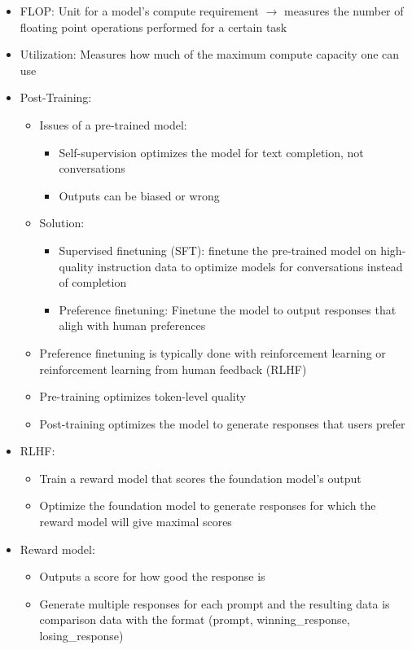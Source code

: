 \documentclass[11pt]{scrartcl}
\begin{document}
\begin{itemize}
	\item FLOP: Unit for a model's compute requirement $\to$ measures the number of floating point operations performed for a certain task
	\item Utilization: Measures how much of the maximum compute capacity one can use
	\item Post-Training:
	\begin{itemize}
		\item Issues of a pre-trained model: 
		\begin{itemize}
			\item Self-supervision optimizes the model for text completion, not conversations
			\item Outputs can be biased or wrong
		\end{itemize}
		\item Solution:
		\begin{itemize}
			\item Supervised finetuning (SFT): finetune the pre-trained model on high-quality instruction data to optimize models for conversations instead of completion
			\item Preference finetuning: Finetune the model to output responses that aligh with human preferences
		\end{itemize}
		\item Preference finetuning is typically done with reinforcement learning or reinforcement learning from human feedback (RLHF)
		\item Pre-training optimizes token-level quality
		\item Post-training optimizes the model to generate responses that users prefer
	\end{itemize}
	\item RLHF:
	\begin{itemize}
		\item Train a reward model that scores the foundation model's output
		\item Optimize the foundation model to generate responses for which the reward model will give maximal scores
	\end{itemize}
	\item Reward model: 
	\begin{itemize}
		\item Outputs a score for how good the response is
		\item Generate multiple responses for each prompt and the resulting data is comparison data with the format (prompt, winning\_response, losing\_response)

\end{itemize}
\end{itemize}
\end{document}

